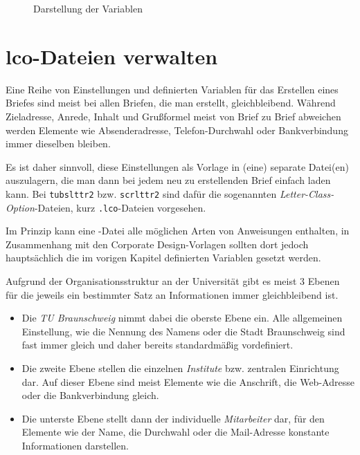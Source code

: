 \begin{figure}[!ht]
\centering{}
\caption{Darstellung der Variablen}
\label{fig:lettervarpos}
\end{figure}\clearpage


\section{lco-Dateien verwalten}\label{sec:lco}

Eine Reihe von Einstellungen und definierten Variablen für das Erstellen eines
Briefes sind meist bei allen Briefen, die man erstellt, gleichbleibend.
Während Zieladresse, Anrede, Inhalt und Grußformel meist von Brief zu Brief
abweichen werden Elemente wie Absenderadresse, Telefon-Durchwahl oder
Bankverbindung immer dieselben bleiben.

Es ist daher sinnvoll, diese Einstellungen als Vorlage in (eine) separate Datei(en)
auszulagern, die man dann bei jedem neu zu erstellenden Brief einfach laden
kann. Bei \texttt{tubslttr2} bzw. \texttt{scrlttr2} sind dafür die sogenannten
\emph{Letter-Class-Option}-Dateien, kurz \texttt{.lco}-Dateien vorgesehen.

Im Prinzip kann eine -Datei alle möglichen Arten von Anweisungen
enthalten, in Zusammenhang mit den Corporate Design-Vorlagen sollten dort jedoch
hauptsächlich die im vorigen Kapitel definierten Variablen gesetzt werden.

Aufgrund der Organisationsstruktur an der Universität gibt es meist 3 Ebenen für
die jeweils ein bestimmter Satz an Informationen immer gleichbleibend ist.

\begin{itemize}
  \item Die \emph{TU Braunschweig} nimmt dabei die oberste Ebene ein.
    Alle allgemeinen Einstellung, wie die Nennung des Namens oder die Stadt Braunschweig sind
    fast immer gleich und daher bereits standardmäßig vordefiniert.

  \item Die zweite Ebene stellen die einzelnen \emph{Institute} bzw.
    zentralen Einrichtung dar. Auf dieser Ebene sind meist Elemente wie die
    Anschrift, die Web-Adresse oder die Bankverbindung gleich.

  \item Die unterste Ebene stellt dann der individuelle \emph{Mitarbeiter} dar,
    für den Elemente wie der Name, die Durchwahl oder die Mail-Adresse konstante
    Informationen darstellen.
\end{itemize}

